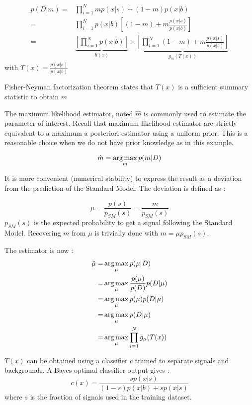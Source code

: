 \begin{align*}
	p(D|m) =& \prod_{i=1}^N m p(x|s) + (1-m) p(x|b) \\
	       =& \prod_{i=1}^N p(x|b) \left [(1-m) + m \frac{p(x|s)}{p(x|b)} \right ]\\
	       =& \underbrace{\left[ \prod_{i=1}^N p(x|b) \right ]}_{h(x)} \times 
	       \underbrace{\left [\prod_{i=1}^N (1-m) + m \frac{p(x|s)}{p(x|b)} \right ]}_{g_m(T(x))}
\end{align*}
with $T(x) = \frac{p(x|s)}{p(x|b)} $

Fisher-Neyman factorization theorem states that $T(x)$ is a sufficient summary statistic to obtain $m$

The maximum likelihood estimator, noted $\hat m$ is commonly used to estimate the parameter of interest.
Recall that maximum likelihood estimator are strictly equivalent to a maximum a posteriori estimator using a uniform prior.
This is a reasonable choice when we do not have prior knowledge as in this example.

\begin{equation}
	\hat m = \operatorname*{arg\,max}_m p(m | D)
\end{equation}

It is more convenient (numerical stability) to express the result as a deviation from the prediction of the Standard Model.
The deviation is defined as :

\begin{equation}
	\mu = \frac{p(s)}{p_{SM}(s)} = \frac{m}{p_{SM}(s)}
\end{equation}
$p_{SM}(s)$ is the expected probability to get a signal following the Standard Model.
Recovering $m$ from $\mu$ is trivially done with $m = \mu p_{SM}(s)$.

The estimator is now :
\begin{align}
	\hat\mu =& \operatorname*{arg\,max}_\mu p(\mu | D) \\
	     =& \operatorname*{arg\,max}_\mu \frac{p(\mu)}{p(D)} p(D | \mu) \\
	     =& \operatorname*{arg\,max}_\mu p(\mu) p(D | \mu) \\
	     =& \operatorname*{arg\,max}_\mu  p(D | \mu) \\
	     =& \operatorname*{arg\,max}_\mu  \prod_{i=1}^N g_\mu(T(x)) \\
\end{align}


$T(x)$ can be obtained using a classifier $c$ trained to separate signals and backgrounds.
A Bayes optimal classifier output gives :
\begin{equation}
	c(x) = \frac{s p(x|s)}{(1-s) p(x|b) + s p(x|s)}
\end{equation}
where $s$ is the fraction of signals used in the training dataset.


